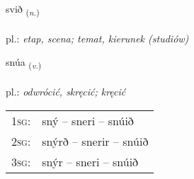 \documentclass[frontgrid, backgrid]{flacards}\usepackage[]{graphicx}\usepackage[]{xcolor}
\begin{document}
\renewcommand{\flhead}{\vskip5pt \fboxsep=0pt {\small\bfseries\footnotesize Nafnorð | Noun}}
\renewcommand{\fcfoot}{\vskip5pt \fboxsep=0pt \hspace{2pt}{\small\bfseries\footnotesize 1K}}

\renewcommand{\blhead}{\vskip5pt {\small\bfseries\footnotesize Nafnorð | Noun }}
\renewcommand{\bcfoot}{\vskip5pt \hspace{2pt}{\small\bfseries\footnotesize 1K}}


{svið \small{\textsubscript{(\textit{n.})}} \\[1ex] %
\textphonetic{[svɪːð]} \\
pl.: \emph{etap, scena; temat, kierunek (studiów)} \\  [2ex]
\renewcommand*{\arraystretch}{0.8}
}

\renewcommand{\flhead}{\vskip5pt \fboxsep=0pt {\small\bfseries\footnotesize Sagnorð | Verb}}
\renewcommand{\fcfoot}{\vskip5pt \fboxsep=0pt \hspace{2pt}{\small\bfseries\footnotesize 1K}}

\renewcommand{\blhead}{\vskip5pt {\small\bfseries\footnotesize Sagnorð | Verb }}
\renewcommand{\bcfoot}{\vskip5pt \hspace{2pt}{\small\bfseries\footnotesize 1K}}


{snúa \small{\textsubscript{(\textit{v.})}} \\[1ex] %
\textphonetic{[stnuːa]} \\
pl.: \emph{odwrócić, skręcić; kręcić} \\  [2ex]
\renewcommand*{\arraystretch}{0.8}
\begin{tabular}{p{1cm}l}
\textsc{1sg}: & sný -- sneri -- snúið \\ 
\textsc{2sg}: & snýrð -- snerir -- snúið \\ 
\textsc{3sg}: & snýr -- sneri -- snúið \\ 
\end{tabular}
}
\end{document}
